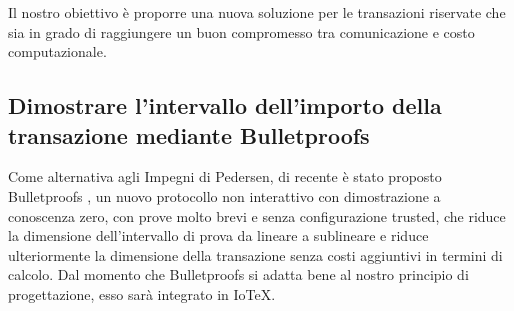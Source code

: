 Il nostro obiettivo è proporre una nuova soluzione per le transazioni riservate che sia in grado di raggiungere un buon compromesso tra comunicazione e costo computazionale.

\subsection{Dimostrare l'intervallo dell'importo della transazione mediante Bulletproofs}
Come alternativa agli Impegni di Pedersen, di recente è stato proposto Bulletproofs \cite{c5}, un nuovo protocollo non interattivo con dimostrazione a conoscenza zero, con prove molto brevi e senza configurazione trusted, che riduce la dimensione dell'intervallo di prova da lineare a sublineare e riduce ulteriormente la dimensione della transazione senza costi aggiuntivi in termini di calcolo. Dal momento che  Bulletproofs si adatta bene al nostro principio di progettazione, esso sarà integrato in IoTeX.
